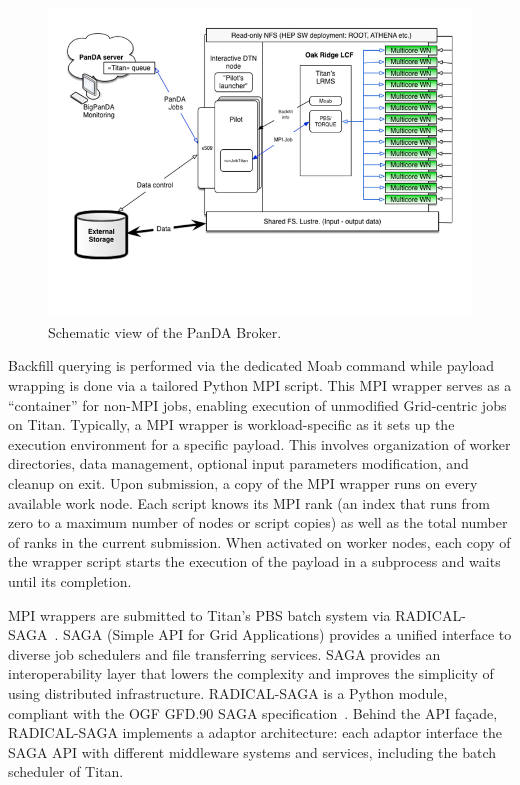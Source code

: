 \begin{figure}
  \begin{center}
    \includegraphics[width=\columnwidth]{figures/PanDA_setup_at_OLCF.png}
    \caption{Schematic view of the PanDA Broker.}
  \end{center}
\label{fig:panda_broker}
\end{figure}

Backfill querying is performed via the dedicated Moab command while payload
wrapping is done via a tailored Python MPI script. This MPI wrapper serves as a
``container'' for non-MPI jobs, enabling execution of unmodified Grid-centric
jobs on Titan. Typically, a MPI wrapper is workload-specific as it sets up the
execution environment for a specific payload. This involves organization of
worker directories, data management, optional input parameters modification, and
cleanup on exit. Upon submission, a copy of the MPI wrapper runs on every
available work node. Each script knows its MPI rank (an index that runs from
zero to a maximum number of nodes or script copies) as well as the total number
of ranks in the current submission. When activated on worker nodes, each copy of
the wrapper script starts the execution of the payload in a subprocess and waits
until its completion.

MPI wrappers are submitted to Titan's PBS batch system via
RADICAL-SAGA~\cite{radical-saga}. SAGA (Simple API for Grid Applications)
provides a unified interface to diverse job schedulers and file transferring
services. SAGA provides an interoperability layer that lowers the complexity and
improves the simplicity of using distributed infrastructure. RADICAL-SAGA is a
Python module, compliant with the OGF GFD.90 SAGA
specification~\cite{saga-spec}. Behind the API façade, RADICAL-SAGA implements a
adaptor architecture: each adaptor interface the SAGA API with different
middleware systems and services, including the batch scheduler of Titan.

